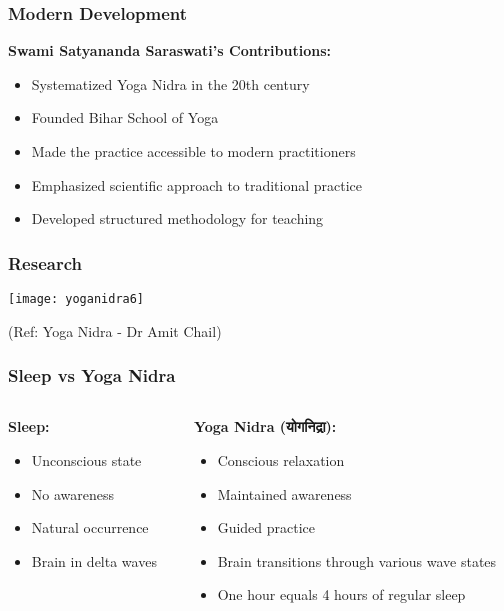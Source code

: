 \begin{frame}[fragile]\frametitle{Modern Development}
    \textbf{Swami Satyananda Saraswati's Contributions:}
    \begin{itemize}
        \item Systematized Yoga Nidra in the 20th century
        \item Founded Bihar School of Yoga
        \item Made the practice accessible to modern practitioners
        \item Emphasized scientific approach to traditional practice
        \item Developed structured methodology for teaching
    \end{itemize}
\end{frame}

\begin{frame}[fragile]\frametitle{Research}
      \begin{center}
        \texttt{[image: yoganidra6]}

		{\tiny (Ref: Yoga Nidra - Dr Amit Chail)}		
        \end{center}

\end{frame}

\begin{frame}[fragile]\frametitle{Sleep vs Yoga Nidra}
    \begin{columns}
        \begin{column}{0.48\textwidth}
            \textbf{Sleep:}
            \begin{itemize}
                \item Unconscious state
                \item No awareness
                \item Natural occurrence
                \item Brain in delta waves
            \end{itemize}
        \end{column}
        \begin{column}{0.48\textwidth}
            \textbf{Yoga Nidra (योगनिद्रा):}
            \begin{itemize}
                \item Conscious relaxation
                \item Maintained awareness
                \item Guided practice
                \item Brain transitions through various wave states
                \item One hour equals 4 hours of regular sleep
            \end{itemize}
        \end{column}
    \end{columns}
\end{frame}

